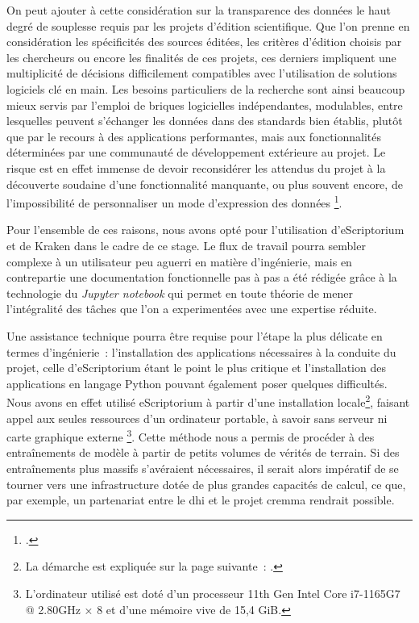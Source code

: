 \documentclass[a4paper,12pt,twoside]{book}
\begin{document}
				On peut ajouter à cette considération sur la transparence des données le haut degré de souplesse requis par les projets d'édition scientifique. Que l'on prenne en considération les spécificités des sources éditées, les critères d'édition choisis par les chercheurs ou encore les finalités de ces projets, ces derniers impliquent une multiplicité de décisions difficilement compatibles avec l'utilisation de solutions logiciels clé en main. Les besoins particuliers de la recherche sont ainsi beaucoup mieux servis par l'emploi de briques logicielles indépendantes, modulables, entre lesquelles peuvent s'échanger les données dans des standards bien établis, plutôt que par le recours à des applications performantes, mais aux fonctionnalités déterminées par une communauté de développement extérieure au projet. Le risque est en effet immense de devoir reconsidérer les attendus du projet à la découverte soudaine d'une fonctionnalité manquante, ou plus souvent encore, de l'impossibilité de personnaliser un mode d'expression des données
				\footcite{stokesEScriptoriumVREManuscript2021}.
				
				Pour l'ensemble de ces raisons, nous avons opté pour l'utilisation d'eScriptorium et de Kraken dans le cadre de ce stage. Le flux de travail pourra sembler complexe à un utilisateur peu aguerri en matière d'ingénierie, mais en contrepartie une documentation fonctionnelle pas à pas a été rédigée grâce à la technologie du \textit{Jupyter notebook} qui permet en toute théorie de mener l'intégralité des tâches que l'on a experimentées avec une expertise réduite.
							
				Une assistance technique pourra être requise pour l'étape la plus délicate en termes d'ingénierie~: l'installation des applications nécessaires à la conduite du projet, celle d'eScriptorium étant le point le plus critique et l'installation des applications en langage Python pouvant également poser quelques difficultés. Nous avons en effet utilisé eScriptorium à partir d'une installation locale\footnote{La démarche est expliquée sur la page suivante~: \cite{DockerInstallInstallation}.}, faisant appel aux seules ressources d'un ordinateur portable, à savoir sans serveur ni carte graphique externe
				\footnote{
					L'ordinateur utilisé est doté d'un processeur 11th Gen Intel Core i7-1165G7 @ 2.80GHz × 8 et d'une mémoire vive de 15,4 GiB.
				}.
				Cette méthode nous a permis de procéder à des entraînements de modèle à partir de petits volumes de vérités de terrain. Si des entraînements plus massifs s'avéraient nécessaires, il serait alors impératif de se tourner vers une infrastructure dotée de plus grandes capacités de calcul, ce que, par exemple, un partenariat entre le \gls{dhi} et le projet \gls{cremma} rendrait possible.
						
\end{document}
